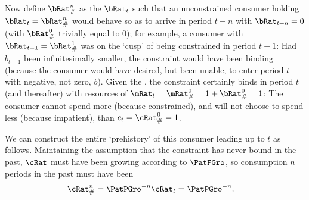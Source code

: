 \documentclass[\econtexRoot/BufferStockTheory]{subfiles}
\begin{document}
Now define $\bRat_{\#}^{n}$ as the $\bRat_{t}$ such that
an unconstrained consumer holding $\bRat_{t}=\bRat_{\#}^{n}$ would behave so as to arrive in period $t+n$ with $\bRat_{t+n}=0$ (with $\bRat_{\#}^{0}$ trivially equal to 0); for example, a consumer with $\bRat_{t-1}=\bRat_{\#}^{1}$ was on the `cusp' of being constrained in period
$t-1$: Had $b_{t-1}$ been infinitesimally smaller, the constraint
would have been binding (because the consumer would have desired, but
been unable, to enter period $t$ with negative, not zero, $b$).  Given
the \PFGIC, the constraint certainly binds in period $t$ (and
thereafter) with resources of
$\mRat_{t}=\mRat_{\#}^{0}=1+\bRat_{\#}^{0}=1$: The consumer cannot
spend more (because constrained), and will not choose to spend less
(because impatient), than $c_{t}=\cRat_{\#}^{0}=1$.

We can construct the entire `prehistory' of this consumer leading up to $t$ as follows.
Maintaining the assumption that the constraint has never bound in the past,
$\cRat$ must have been growing according to $\PatPGro$, so consumption $n$ periods in the past must have been
\begin{equation}\begin{gathered}\begin{aligned}
  \cRat_{\#}^{n}  & = \PatPGro^{-n} \cRat_{t} = \PatPGro^{-n}. \label{eq:cPreHist}
\end{aligned}\end{gathered}\end{equation}
\end{document}
